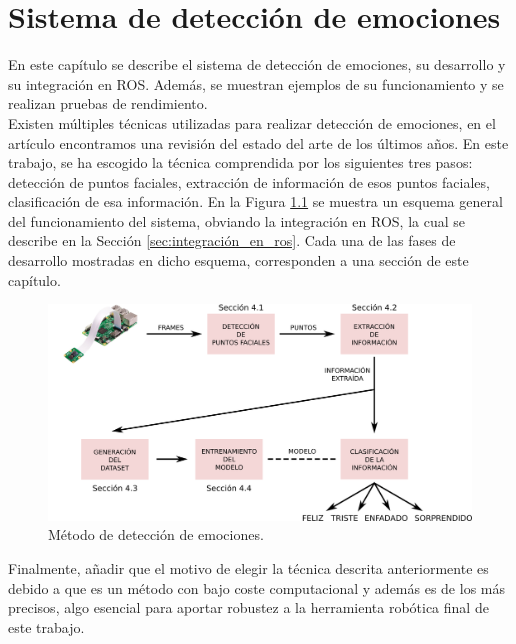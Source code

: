 \chapter{Sistema de detección de emociones}
\label{cap:capitulo4}

En este capítulo se describe el sistema de detección de emociones, su desarrollo y su integración en ROS. Además, se muestran ejemplos de su funcionamiento y se realizan pruebas de rendimiento.\\

Existen múltiples técnicas utilizadas para realizar detección de emociones, en el artículo \cite{literature_review} encontramos una revisión del estado del arte de los últimos años. En este trabajo, se ha escogido la técnica comprendida por los siguientes tres pasos: detección de puntos faciales, extracción de información de esos puntos faciales, clasificación de esa información. En la Figura \ref{fig:metodo} se muestra un esquema general del funcionamiento del sistema, obviando la integración en ROS, la cual se describe en la Sección \ref{sec:integración_en_ros}. Cada una de las fases de desarrollo mostradas en dicho esquema, corresponden a una sección de este capítulo.\\

\begin{figure} [h!]
  \begin{center}
    \includegraphics[width=16cm]{figs/metodo.png}
  \end{center}
  \captionsetup{justification=centering}
  \caption{Método de detección de emociones.}
  \label{fig:metodo}
\end{figure}

Finalmente, añadir que el motivo de elegir la técnica descrita anteriormente es debido a que es un método con bajo coste computacional y además es de los más precisos, algo esencial para aportar robustez a la herramienta robótica final de este trabajo.

